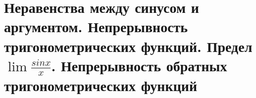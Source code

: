 \section{Неравенства между синусом и аргументом. Непрерывность тригонометрических функций. Предел $\lim{\frac{sin x}{x}}$. Непрерывность обратных тригонометрических функций}
